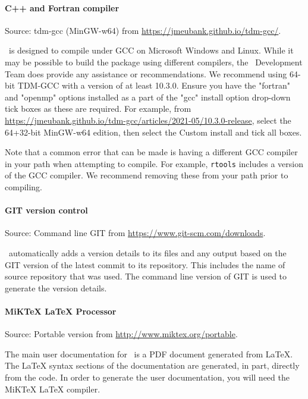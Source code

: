 \paragraph*{C++ and Fortran compiler}

Source: tdm-gcc (MinGW-w64) from \url{https://jmeubank.github.io/tdm-gcc/}.

\CNAME\ is designed to compile under GCC on Microsoft Windows and Linux. While it may be possible to build the package using different compilers, the \CNAME\ Development Team does provide any assistance or recommendations. We recommend using 64-bit TDM-GCC with a version of at least 10.3.0. Ensure you have the "fortran" and "openmp" options installed as a part of the "gcc" install option drop-down tick boxes as these are required. For example, from  \url{https://jmeubank.github.io/tdm-gcc/articles/2021-05/10.3.0-release}, select the 64+32-bit MinGW-w64 edition, then select the Custom install and tick all boxes. 

Note that a common error that can be made is having a different GCC compiler in your path when attempting to compile. For example, \texttt{rtools} includes a version of the GCC compiler. We recommend removing these from your path prior to compiling.

\paragraph*{GIT version control}

Source: Command line GIT from \url{https://www.git-scm.com/downloads}.

\CNAME\ automatically adds a version details to its files and any output based on the GIT version of the latest commit to its repository. This includes the name of source repository that was used. The command line version of GIT is used  to generate the version details.

\paragraph*{MiKTeX LaTeX Processor}

Source: Portable version from \url{http://www.miktex.org/portable}.

The main user documentation for \CNAME\ is a PDF document generated from LaTeX. The LaTeX syntax sections of the documentation are generated, in part, directly from the code. In order to generate the user documentation, you will need the MiKTeX LaTeX compiler.

